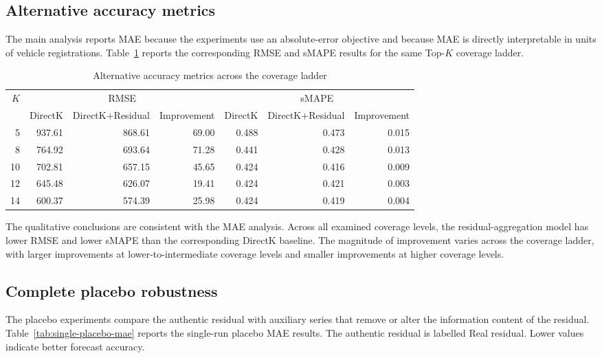 \subsection{Alternative accuracy metrics}
\label{app:alternative-metrics}

The main analysis reports MAE because the experiments use an absolute-error objective and because MAE is directly interpretable in units of vehicle registrations. Table~\ref{tab:alternative-metrics} reports the corresponding RMSE and sMAPE results for the same Top-\(K\) coverage ladder.

\begin{table}[!htbp]
\centering
\caption{Alternative accuracy metrics across the coverage ladder}
\label{tab:alternative-metrics}
\begin{tabular}{rrrrrrr}
\hline
\(K\) & \multicolumn{3}{c}{RMSE} & \multicolumn{3}{c}{sMAPE} \\
\cline{2-4}\cline{5-7}
 & DirectK & DirectK+Residual & Improvement & DirectK & DirectK+Residual & Improvement \\
\hline
5  & 937.61 & 868.61 & 69.00 & 0.488 & 0.473 & 0.015 \\
8  & 764.92 & 693.64 & 71.28 & 0.441 & 0.428 & 0.013 \\
10 & 702.81 & 657.15 & 45.65 & 0.424 & 0.416 & 0.009 \\
12 & 645.48 & 626.07 & 19.41 & 0.424 & 0.421 & 0.003 \\
14 & 600.37 & 574.39 & 25.98 & 0.424 & 0.419 & 0.004 \\
\hline
\end{tabular}
\end{table}

The qualitative conclusions are consistent with the MAE analysis. Across all examined coverage levels, the residual-aggregation model has lower RMSE and lower sMAPE than the corresponding DirectK baseline. The magnitude of improvement varies across the coverage ladder, with larger improvements at lower-to-intermediate coverage levels and smaller improvements at higher coverage levels.

\subsection{Complete placebo robustness}
\label{app:complete-placebo}

The placebo experiments compare the authentic residual with auxiliary series that remove or alter the information content of the residual. Table~\ref{tab:single-placebo-mae} reports the single-run placebo MAE results. The authentic residual is labelled Real residual. Lower values indicate better forecast accuracy.


